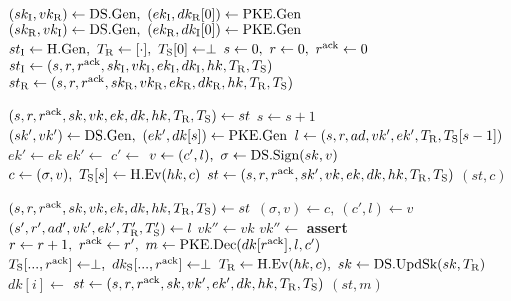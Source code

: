 \algrenewcommand\textproc{}
\algrenewcommand{}

\begin{minipage}{1\linewidth}
  {\fontsize{8}{10}\selectfont

  \begin{algorithmic}[1]
    \State $(sk_\t{I},vk_\t{R}) \gets \t{DS.Gen}, \ (ek_\t{I},dk_\t{R}[0]) \gets \t{PKE.Gen}$
    \State $(sk_\t{R},vk_\t{I}) \gets \t{DS.Gen}, \ (ek_\t{R},dk_\t{I}[0]) \gets \t{PKE.Gen}$
    \State $st_\text{I} \gets \text{H.Gen}, \ T_\text{R} \gets [\cdot], \ T_\text{S}[0] \gets \perp$
    \State $s \gets 0, \ r \gets 0, \ r^\t{ack} \gets 0$
    \State $st_\text{I} \gets (s,r,r^\text{ack},sk_\text{I},vk_\text{I},ek_\text{I},dk_\text{I},hk,T_\text{R},T_\text{S})$
    \State $st_\text{R} \gets (s,r,r^\text{ack},sk_\text{R},vk_\text{R},ek_\text{R},dk_\text{R},hk,T_\text{R},T_\text{S})$
    \EndProcedure
    
    \item[]
    
    \State $(s,r,r^\text{ack},sk,vk,ek,dk,hk,T_\text{R},T_\text{S}) \gets st$
    \State $s \gets s+1$
    \State $(sk',vk') \gets \text{DS.Gen}, \ (ek',dk[s]) \gets \text{PKE.Gen}$
    \State $l \gets (s,r,ad,vk',ek',T_\text{R},T_\text{S}[s-1])$
    \State $ek' \gets ek$
    \State $ek' \gets$ 
    \EndFor
    \State $c' \gets$ 
    \State $v \gets (c',l), \ \sigma \gets \text{DS.Sign}(sk,v)$
    \State $c \gets (\sigma,v), \ T_\text{S}[s] \gets \text{H.Ev}(hk,c)$
    \State $st \gets (s,r,r^\text{ack},sk',vk,ek,dk,hk,T_\text{R},T_\text{S})$
    \State \Return $(st,c)$
    \EndProcedure

    \item[]

    \State $(s,r,r^\text{ack},sk,vk,ek,dk,hk,T_\text{R},T_\text{S}) \gets st$
    \State $(\sigma,v) \gets c, \ (c',l) \gets v$
    \State $(s',r',ad',vk',ek',T_\text{R}',T_\text{S}') \gets l$
    \State $vk'' \gets vk$
    \State $vk'' \gets$ 
    \EndFor
    \State \textbf{assert} 
    \State $r \gets r+1, \ r^\t{ack} \gets r' , \ m \gets \t{PKE.Dec}(dk[r^\t{ack}],l,c')$
    \State $T_\t{S}[...,r^\t{ack}] \gets \perp, \ dk_\t{S}[...,r^\t{ack}] \gets \perp$
    \State $T_\text{R} \gets \text{H.Ev}(hk,c), \ sk \gets \text{DS.UpdSk}(sk,T_\text{R})$
    \State $dk[i] \gets$ 
    \EndFor
    \State $st \gets (s,r,r^\text{ack},sk,vk',ek',dk,hk,T_\text{R},T_\text{S})$
    \State \Return $(st,m)$
    \EndProcedure

  \end{algorithmic}
  }
\end{minipage}